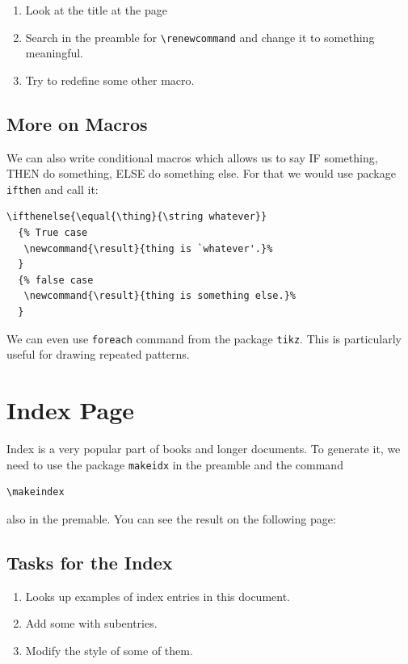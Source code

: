 \documentclass[a4paper,10pt]{report} %
\begin{document}
\begin{enumerate}
 \item Look at the title at the page \pageref{contents}
 \item Search in the preamble for \texttt{\textbackslash renewcommand} and change it to something meaningful.
 \item Try to redefine some other macro. 
\end{enumerate}


\subsection{More on Macros} 
 We can also write conditional macros which allows us to say IF something, THEN do something, ELSE do something else. For that we would use package \texttt{ifthen} and call it:
 

\begin{lstlisting}[language={[latex]tex},
    frame=single,basicstyle=\footnotesize]
    \ifthenelse{\equal{\thing}{\string whatever}}
  {% True case
   \newcommand{\result}{thing is `whatever'.}%
  }
  {% false case
   \newcommand{\result}{thing is something else.}%
  }
 \end{lstlisting}
 
 We can even use \texttt{foreach} command from the package \texttt{tikz}. This is particularly useful for drawing repeated patterns.
 
\section{Index Page}
Index is a very popular part of books and longer documents.
To generate it, we need to use the package \texttt{makeidx} in the preamble and the command 
\begin{lstlisting}[language={[latex]tex},
    frame=single,basicstyle=\footnotesize]
     \makeindex
\end{lstlisting}
also in the premable. You can see the result on the following page:


  \clearpage
  \label{index}  
  \printindex   
   
  \subsection{Tasks for the Index}
  \begin{enumerate}
   \item Looks up examples of index entries in this document.
   \item Add some with subentries. 
   \item Modify the style of some of them.
  \end{enumerate}
\end{document}
